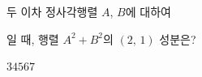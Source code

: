 \hspace*{2mm}\begin{minipage}[t]{\dimexpr\linewidth-2mm\relax}\vspace{0pt}
두 이차 정사각행렬 $A$, $B$에 대하여 \par\smallskip{}\par\smallskip\noindent 일 때, 행렬 $A^2+B^2$의 $(2,\,1)$ 성분은?
\begin{choices32}{$3$}{$4$}{$5$}{$6$}{$7$}\end{choices32}\end{minipage}
